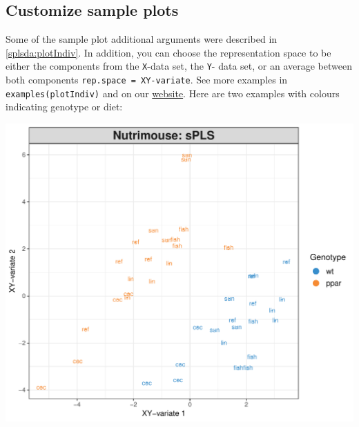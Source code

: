 \documentclass[]{book}
\newenvironment{Shaded}{\begin{snugshade}}{\end{snugshade}}
\newcommand{\DataTypeTok}[1]{\textcolor[rgb]{0.13,0.29,0.53}{#1}}
\newcommand{\KeywordTok}[1]{\textcolor[rgb]{0.13,0.29,0.53}{\textbf{#1}}}
\newcommand{\NormalTok}[1]{#1}
\newcommand{\OperatorTok}[1]{\textcolor[rgb]{0.81,0.36,0.00}{\textbf{#1}}}
\newcommand{\OtherTok}[1]{\textcolor[rgb]{0.56,0.35,0.01}{#1}}
\newcommand{\StringTok}[1]{\textcolor[rgb]{0.31,0.60,0.02}{#1}}
\begin{document}
\hypertarget{pls:plotIndiv}{%
\subsection{Customize sample plots}\label{pls:plotIndiv}}

Some of the sample plot additional arguments were described in \ref{splsda:plotIndiv}. In addition, you can choose the representation space to be either the components from the \texttt{X}-data set, the \texttt{Y}- data set, or an average between both components \texttt{rep.space\ =\ \textquotesingle{}XY-variate\textquotesingle{}}. See more examples in \texttt{examples(plotIndiv)} and on our \href{http://mixomics.org/graphics/sample-plots/}{website}. Here are two examples with colours indicating genotype or diet:

\begin{Shaded}
\end{Shaded}

\begin{center}\includegraphics[width=0.5\linewidth,]{Figures/05-pls-plotIndiv-1-1} \end{center}

\begin{Shaded}
\end{Shaded}
\end{document}
